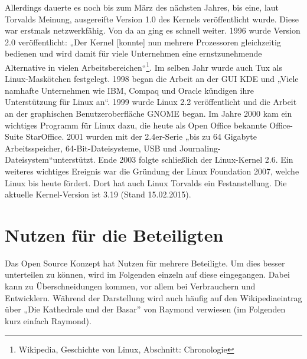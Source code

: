 \documentclass[a4paper,12pt]{article}
\begin{document}
Allerdings dauerte es noch bis zum März des nächsten Jahres, bis eine, laut Torvalds Meinung, ausgereifte Version 1.0 des Kernels veröffentlicht wurde. Diese war erstmals netzwerkfähig. Von da an ging es schnell weiter. 1996 wurde Version 2.0 veröffentlicht: „Der Kernel [konnte] nun mehrere Prozessoren gleichzeitig bedienen und wird damit für viele Unternehmen eine ernstzunehmende Alternative in vielen Arbeitsbereichen“\footnote{Wikipedia, Geschichte von Linux, Abschnitt: Chronologie}. Im selben Jahr wurde auch Tux als Linux-Maskötchen festgelegt. 1998 began die Arbeit an der GUI KDE und „Viele namhafte Unternehmen wie IBM, Compaq und Oracle kündigen ihre Unterstützung für Linux an“\footnotemark[18]. 1999 wurde Linux 2.2 veröffentlicht und die Arbeit an der graphischen Benutzeroberfläche GNOME began. Im Jahre 2000 kam ein wichtiges Programm für Linux dazu, die heute als Open Office bekannte Office-Suite StarOffice. 2001 wurden mit der 2.4er-Serie „bis zu 64 Gigabyte Arbeitsspeicher, 64-Bit-Dateisysteme, USB und Journaling-Dateisystem“\footnotemark[18] unterstützt. Ende 2003 folgte schließlich der Linux-Kernel 2.6. Ein weiteres wichtiges Ereignis war die Gründung der Linux Foundation 2007, welche Linux bis heute fördert. Dort hat auch Linux Torvalds ein Festanstellung. Die aktuelle Kernel-Version ist 3.19 (Stand 15.02.2015).
\section{Nutzen für die Beteiligten}
Das Open Source Konzept hat Nutzen für mehrere Beteiligte. Um dies besser unterteilen zu können, wird im Folgenden einzeln auf diese eingegangen. Dabei kann zu Überschneidungen kommen, vor allem bei Verbrauchern und Entwicklern. Während der Darstellung wird auch häufig auf den Wikipediaeintrag über „Die Kathedrale und der Basar” von Raymond verwiesen (im Folgenden kurz einfach Raymond).
\end{document}
